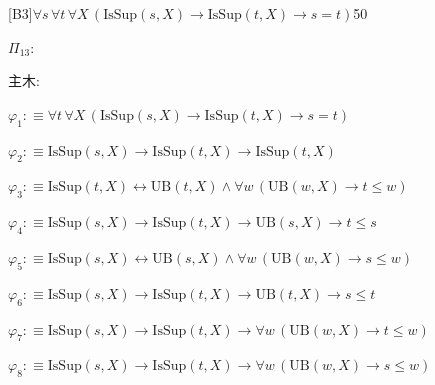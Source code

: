 \begin{fullproof}{[B3]}{$\forall s\,\forall t\,\forall X\,(\mathrm{IsSup}(s,X) \to \mathrm{IsSup}(t,X) \to s = t)$}{50}
\begin{ptree}
\end{ptree}
\noindent$\Pi_{13}$:
\begin{ptree}
\noLine
{}
\noLine
{}
\end{ptree}
\noindent 主木:
\begin{ptree}
\noLine
{}
\noLine
{}
\end{ptree}
\begin{abbrevlist}
\item $\varphi_{1} :\equiv \forall t\,\forall X\,(\mathrm{IsSup}(s,X) \to \mathrm{IsSup}(t,X) \to s = t)$
\item $\varphi_{2} :\equiv \mathrm{IsSup}(s,X) \to \mathrm{IsSup}(t,X) \to \mathrm{IsSup}(t,X)$
\item $\varphi_{3} :\equiv \mathrm{IsSup}(t,X) \leftrightarrow \mathrm{UB}(t,X) \land \forall w\,(\mathrm{UB}(w,X) \to t \leq w)$
\item $\varphi_{4} :\equiv \mathrm{IsSup}(s,X) \to \mathrm{IsSup}(t,X) \to \mathrm{UB}(s,X) \to t \leq s$
\item $\varphi_{5} :\equiv \mathrm{IsSup}(s,X) \leftrightarrow \mathrm{UB}(s,X) \land \forall w\,(\mathrm{UB}(w,X) \to s \leq w)$
\item $\varphi_{6} :\equiv \mathrm{IsSup}(s,X) \to \mathrm{IsSup}(t,X) \to \mathrm{UB}(t,X) \to s \leq t$
\item $\varphi_{7} :\equiv \mathrm{IsSup}(s,X) \to \mathrm{IsSup}(t,X) \to \forall w\,(\mathrm{UB}(w,X) \to t \leq w)$
\item $\varphi_{8} :\equiv \mathrm{IsSup}(s,X) \to \mathrm{IsSup}(t,X) \to \forall w\,(\mathrm{UB}(w,X) \to s \leq w)$

\end{abbrevlist}
\end{fullproof}
